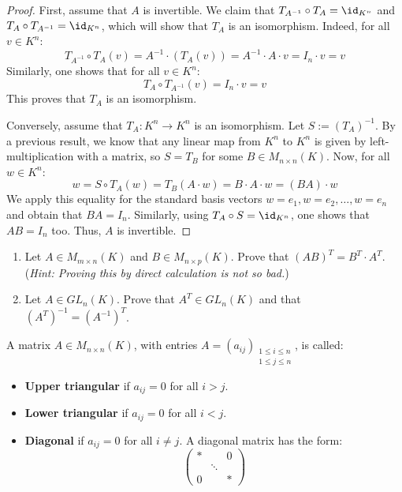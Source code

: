 \begin{proof}
First, assume that $A$ is invertible. We claim that $T_{A^{-1}} \circ T_A = \id_{K^n}$ and $T_A \circ T_{A^{-1}} = \id_{K^n}$, which will show that $T_A$ is an isomorphism. Indeed, for all $v \in K^n$:
\begin{equation*}
    T_{A^{-1}} \circ T_A(v) = A^{-1} \cdot (T_A(v)) = A^{-1} \cdot A \cdot v = I_n \cdot v = v
\end{equation*}
Similarly, one shows that for all $v \in K^n$:
\begin{equation*}
    T_A \circ T_{A^{-1}}(v) = I_n \cdot v = v
\end{equation*}
This proves that $T_A$ is an isomorphism.

Conversely, assume that $T_A: K^n \to K^n$ is an isomorphism. Let $S := (T_A)^{-1}$. By a previous result, we know that any linear map from $K^n$ to $K^n$ is given by left-multiplication with a matrix, so $S = T_B$ for some $B \in M_{n \times n}(K)$. Now, for all $w \in K^n$:
\begin{equation*}
    w = S \circ T_A(w) = T_B(A \cdot w) = B \cdot A \cdot w = (BA) \cdot w
\end{equation*}
We apply this equality for the standard basis vectors $w = e_1, w = e_2, \dots, w = e_n$ and obtain that $BA = I_n$. Similarly, using $T_A \circ S = \id_{K^n}$, one shows that $AB = I_n$ too. Thus, $A$ is invertible.
\end{proof}

\begin{exercise}
\begin{enumerate}
    \item Let $A \in M_{m \times n}(K)$ and $B \in M_{n \times p}(K)$. Prove that $(AB)^T = B^T \cdot A^T$. \newline (\textit{Hint: Proving this by direct calculation is not so bad.})
    \item Let $A \in GL_n(K)$. Prove that $A^T \in GL_n(K)$ and that $(A^T)^{-1} = (A^{-1})^T$.
\end{enumerate}
\end{exercise}

\begin{definition} \label{def:17.a.10}
A matrix $A \in M_{n \times n}(K)$, with entries $A = (a_{ij})_{\substack{1 \le i \le n \\ 1 \le j \le n}}$, is called:
\begin{itemize}
    \item \textbf{Upper triangular} if $a_{ij} = 0$ for all $i > j$.
    \item \textbf{Lower triangular} if $a_{ij} = 0$ for all $i < j$.
    \item \textbf{Diagonal} if $a_{ij} = 0$ for all $i \neq j$. A diagonal matrix has the form:
    \begin{equation*}
        \begin{pmatrix} * & & 0 \\ & \ddots & \\ 0 & & * \end{pmatrix}
    \end{equation*}
\end{itemize}
\end{definition}

